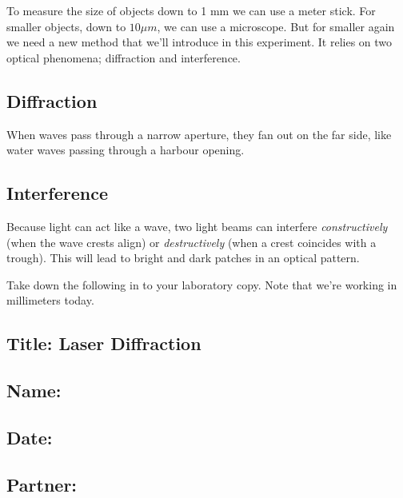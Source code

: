 \documentclass[
  letterpaper,
  DIV=11,
  numbers=noendperiod]{scrreprt}
\begin{document}
To measure the size of objects down to 1 mm we can use a meter stick.
For smaller objects, down to \(10 \mu m\), we can use a microscope. But
for smaller again we need a new method that we'll introduce in this
experiment. It relies on two optical phenomena; diffraction and
interference.

\subsection*{Diffraction}\label{diffraction}

When waves pass through a narrow aperture, they fan out on the far side,
like water waves passing through a harbour opening.

\subsection*{Interference}\label{interference}

Because light can act like a wave, two light beams can interfere
\emph{constructively} (when the wave crests align) or
\emph{destructively} (when a crest coincides with a trough). This will
lead to bright and dark patches in an optical pattern.

Take down the following in to your laboratory copy. Note that we're
working in millimeters today.

\subsection*{\texorpdfstring{{Title: Laser
Diffraction}}{Title: Laser Diffraction}}\label{title-laser-diffraction}

\subsection*{\texorpdfstring{{Name:}}{Name:}}\label{name-8}

\subsection*{\texorpdfstring{{Date:}}{Date:}}\label{date-8}

\subsection*{\texorpdfstring{{Partner:}}{Partner:}}\label{partner-8}
\end{document}
